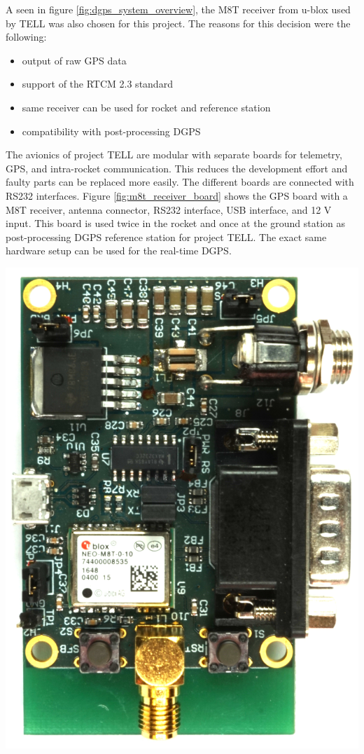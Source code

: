 \begin{minipage}{0.6\textwidth}
  A seen in figure \ref{fig:dgps_system_overview}, the M8T receiver from u-blox used by TELL was also chosen for this project.
  The reasons for this decision were the following:
  \begin{itemize}
  \item output of raw GPS data
  \item support of the RTCM 2.3 standard
  \item same receiver can be used for rocket and reference station
  \item compatibility with post-processing DGPS
  \end{itemize}
  The avionics of project TELL are modular with separate boards for telemetry, GPS, and intra-rocket communication.
  This reduces the development effort and faulty parts can be replaced more easily.
  The different boards are connected with RS232 interfaces.
  Figure \ref{fig:m8t_receiver_board} shows the GPS board with a M8T receiver, antenna connector, RS232 interface, USB interface, and 12 V input.
  This board is used twice in the rocket and once at the ground station as post-processing DGPS reference station for project TELL.
  The exact same hardware setup can be used for the real-time DGPS.
\end{minipage}
\hfill
\begin{minipage}{0.37\textwidth}
 \centering
 \includegraphics[width=\textwidth]{images/M8T_Receiver_Board.jpg}
 \label{fig:m8t_receiver_board}
\end{minipage}

